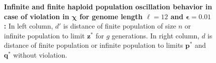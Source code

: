 \begin{figure}[h]
\begin{center}
\hspace{-3em}%
\vspace{-0.5em} \hspace{-3em}%


\caption[\textbf{Infinite and finite haploid population oscillation behavior in case of violation in $\bm{\chi}$ for genome length $\ell = 12$ and $\bm{\epsilon} = 0.01$}]{\textbf{Infinite and finite haploid population oscillation behavior in case of violation in $\bm{\chi}$ for genome length $\ell = 12$ and $\bm{\epsilon} = 0.01$:} 
  In left column, $d'$ is distance of finite population of size $n$ or infinite population to limit $\bm{z}^\ast$ for $g$ generations. In right column, $d$ is distance of finite population or infinite population to limits $\bm{p}^\ast$ and $\bm{q}^\ast$ without violation.}
\label{oscillation_12h_vio_chi_0.01}
\end{center}
\end{figure}

